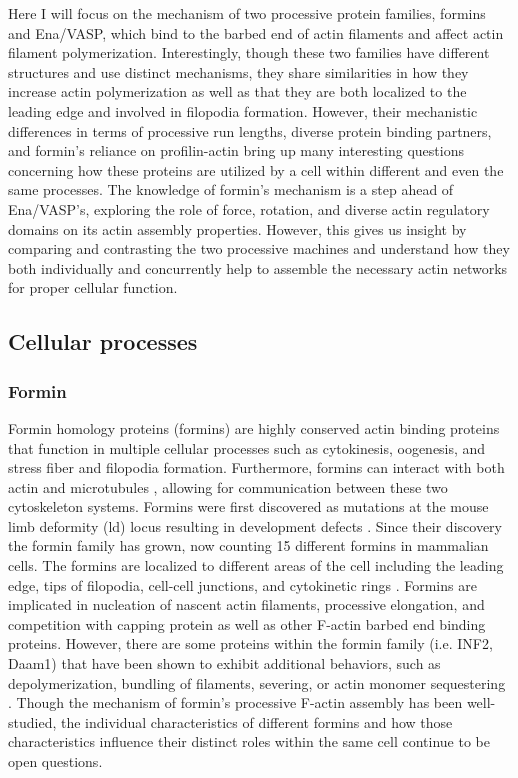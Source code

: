 Here I will focus on the mechanism of two processive protein families, formins and Ena/VASP, which bind to the barbed end of actin filaments and affect actin filament polymerization. Interestingly, though these two families have different structures and use distinct mechanisms, they share similarities in how they increase actin polymerization as well as that they are both localized to the leading edge and involved in filopodia formation. However, their mechanistic differences in terms of processive run lengths, diverse protein binding partners, and formin's reliance on profilin-actin bring up many interesting questions concerning how these proteins are utilized by a cell within different and even the same processes. The knowledge of formin's mechanism is a step ahead of Ena/VASP's, exploring the role of force, rotation, and diverse actin regulatory domains on its actin assembly properties. However, this gives us insight by comparing and contrasting the two processive machines and understand how they both individually and concurrently help to assemble the necessary actin networks for proper cellular function. 

\subsection{Cellular processes}\label{ena-formin-cellular-processes}\label{comparison-cellular}

\subsubsection{Formin}

Formin homology proteins (formins) are highly conserved actin binding proteins that function in multiple cellular processes such as cytokinesis, oogenesis, and stress fiber and filopodia formation. Furthermore, formins can interact with both actin and microtubules \citep{bartolini_formin_2008,henty-ridilla_accelerated_2016}, allowing for communication between these two cytoskeleton systems. Formins were first discovered as mutations at the mouse limb deformity (ld) locus resulting in development defects \citep{woychik_formins:_1990}. Since their discovery the formin family has grown, now counting 15 different formins in mammalian cells. The formins are localized to different areas of the cell including the leading edge, tips of filopodia, cell-cell junctions, and cytokinetic rings \citep{pollard_actin_2016}. Formins are implicated in nucleation of nascent actin filaments, processive elongation, and competition with capping protein as well as other F-actin barbed end binding proteins. However, there are some proteins within the formin family (i.e. INF2, Daam1) that have been shown to exhibit additional behaviors, such as depolymerization, bundling of filaments, severing, or actin monomer sequestering \citep{gurel_assembly_2015}. Though the mechanism of formin's processive F-actin assembly has been well-studied, the individual characteristics of different formins and how those characteristics influence their distinct roles within the same cell continue to be open questions. 


